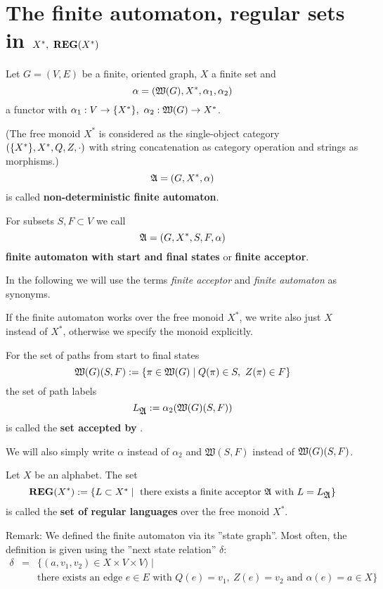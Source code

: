 \section{The finite automaton, regular sets in \texorpdfstring{$X^*,\ 
\reglang(X^*)$}{X*, REG(X*)}}

\begin{definition}
Let $G = (V, E)$ be a finite, oriented graph, $X$ a finite set and
\[\alpha = (\mbox{$\mathfrak{W}({G})$}, X^*,\alpha_1, \alpha_2)\]
a functor with $\alpha_1 : V \to \mbox{$\{X^*\}$},\ \alpha_2 : \mbox{$\mathfrak{W}({G})$} \to X^*$.

(The free monoid $X^*$ is considered as the single-object category
$(\mbox{$\{X^*\}$}, X^*, Q, Z, \cdot)$ with string concatenation as category
operation and strings as morphisms.)
\[ \mbox{$\mathfrak{A}$} = (G, X^*, \alpha) \]
is called {\bf non-deterministic finite automaton}.

For subsets $S, F \subset V$ we call 
\[ \mbox{$\mathfrak{A}$} = (G, X^*, S, F, \alpha) \]
{\bf finite automaton with start and final states} or {\bf finite acceptor}.
\end{definition}

In the following we will use the terms {\em finite acceptor} and {\em finite
automaton} as synonyms.

If the finite automaton works over the free monoid $X^*$, we write also just $X$
instead of $X^*$, otherwise we specify the monoid explicitly.

For the set of paths from start to final states 
\[ \mbox{$\mathfrak{W}({G})$}(S, F) := \mbox{$\{\pi \in \mbox{$\mathfrak{W}({G})$} \mid Q(\pi) \in S,\ Z(\pi)
\in F\}$} \]
the set of path labels
\[ L_{} := \alpha_2(\pathcat{G}(S, F)) \]
is called the {\bf set accepted by} \fa{A}.

We will also simply write $\alpha$ instead of $\alpha_2$ and $\mathfrak{W}(S,
F)$ instead of $\mbox{$\mathfrak{W}({G})$}(S, F)$.

\begin{definition}
Let $X$ be an alphabet. The set
\[ \mbox{{\bf REG}}(X^*) := \mbox{$\{L \subset X^* \mid \text{ there exists a finite acceptor
}\mbox{$\mathfrak{A}$} \text{ with } L = L_{\mbox{$\mathfrak{A}$}}\}$} \]
is called the {\bf set of regular languages} over the free monoid $X^*$.
\end{definition}

Remark: We defined the finite automaton via its ''state graph''. Most
often, the definition is given using the ''next state relation'' $\delta$:
\begin{eqnarray*}
\delta &=& \{(a, v_1, v_2) \in X \times V \times V) \mid \\
&& \text{there exists an edge $e \in E$ with $Q(e) = v_1,\ Z(e) = v_2$ and }
\alpha(e) = a \in X \}
\end{eqnarray*}

